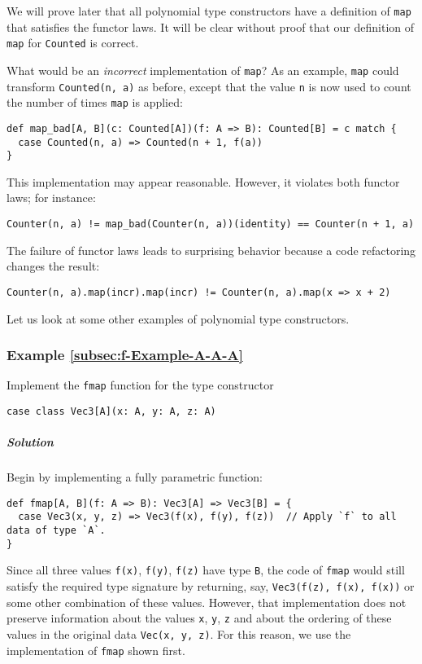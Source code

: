 We will prove later that all polynomial type constructors have a definition
of \lstinline!map! that satisfies the functor laws. It will be clear
without proof that our definition of \lstinline!map! for \lstinline!Counted!
is correct. 

What would be an \emph{incorrect} implementation of \lstinline!map!?
As an example, \lstinline!map! could transform \lstinline!Counted(n, a)!
as before, except that the value \lstinline!n! is now used to count
the number of times \lstinline!map! is applied:
\begin{lstlisting}
def map_bad[A, B](c: Counted[A])(f: A => B): Counted[B] = c match {
  case Counted(n, a) => Counted(n + 1, f(a))
}
\end{lstlisting}
This implementation may appear reasonable. However, it violates both
functor laws; for instance:
\begin{lstlisting}
Counter(n, a) != map_bad(Counter(n, a))(identity) == Counter(n + 1, a)
\end{lstlisting}
The failure of functor laws leads to surprising behavior because a
code refactoring changes the result:
\begin{lstlisting}
Counter(n, a).map(incr).map(incr) != Counter(n, a).map(x => x + 2)
\end{lstlisting}

Let us look at some other examples of polynomial type constructors.

\subsubsection{Example \label{subsec:f-Example-A-A-A}\ref{subsec:f-Example-A-A-A}}

Implement the \lstinline!fmap! function for the type constructor
\begin{lstlisting}
case class Vec3[A](x: A, y: A, z: A)
\end{lstlisting}


\subparagraph{Solution}

Begin by implementing a fully parametric function:
\begin{lstlisting}
def fmap[A, B](f: A => B): Vec3[A] => Vec3[B] = {
  case Vec3(x, y, z) => Vec3(f(x), f(y), f(z))  // Apply `f` to all data of type `A`.
}
\end{lstlisting}
Since all three values \lstinline!f(x)!, \lstinline!f(y)!, \lstinline!f(z)!
have type \lstinline!B!, the code of \lstinline!fmap! would still
satisfy the required type signature by returning, say, \lstinline!Vec3(f(z), f(x), f(x))!
or some other combination of these values. However, that implementation
does not preserve information about the values \lstinline!x!, \lstinline!y!,
\lstinline!z! and about the ordering of these values in the original
data \lstinline!Vec(x, y, z)!. For this reason, we use the implementation
of \lstinline!fmap! shown first.


